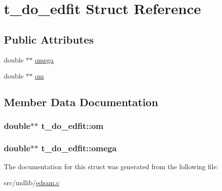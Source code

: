 \hypertarget{structt__do__edfit}{\section{t\-\_\-do\-\_\-edfit \-Struct \-Reference}
\label{structt__do__edfit}
}
\subsection*{\-Public \-Attributes}
\begin{DoxyCompactItemize}
\item 
double $\ast$$\ast$ \hyperlink{structt__do__edfit_a7d3e1f6a1d113cf7b653fb8097c744bc}{omega}
\item 
double $\ast$$\ast$ \hyperlink{structt__do__edfit_aa16a100777864b423c4d48835806eade}{om}
\end{DoxyCompactItemize}


\subsection{\-Member \-Data \-Documentation}
\hypertarget{structt__do__edfit_aa16a100777864b423c4d48835806eade}{
\subsubsection[{om}]{\setlength{\rightskip}{0pt plus 5cm}double$\ast$$\ast$ {\bf t\-\_\-do\-\_\-edfit\-::om}}}\label{structt__do__edfit_aa16a100777864b423c4d48835806eade}
\hypertarget{structt__do__edfit_a7d3e1f6a1d113cf7b653fb8097c744bc}{
\subsubsection[{omega}]{\setlength{\rightskip}{0pt plus 5cm}double$\ast$$\ast$ {\bf t\-\_\-do\-\_\-edfit\-::omega}}}\label{structt__do__edfit_a7d3e1f6a1d113cf7b653fb8097c744bc}


\-The documentation for this struct was generated from the following file\-:\begin{DoxyCompactItemize}
\item 
src/mdlib/\hyperlink{edsam_8c}{edsam.\-c}\end{DoxyCompactItemize}
